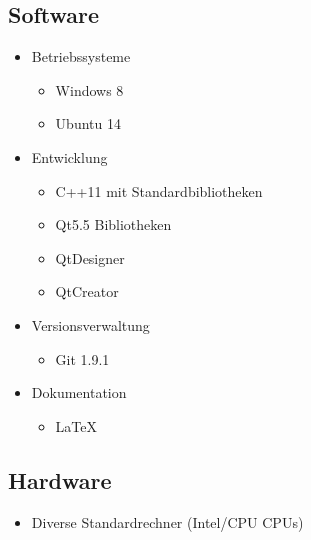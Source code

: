 \subsection{Software}
\begin{itemize}
\item Betriebssysteme
	\begin{itemize}[label={--}]
		\item Windows 8
		\item Ubuntu 14
	\end{itemize}
\item Entwicklung
	\begin{itemize}[label={--}]
		\item C++11 mit Standardbibliotheken
		\item Qt5.5 Bibliotheken
		\item QtDesigner
		\item QtCreator
	\end{itemize}
\item Versionsverwaltung
	\begin{itemize}[label={--}]
		\item Git 1.9.1
	\end{itemize}
\item Dokumentation
	\begin{itemize}[label={--}]
		\item LaTeX
	\end{itemize}
\end{itemize}

\subsection{Hardware}
\begin{itemize}
	\item Diverse Standardrechner (Intel/CPU CPUs)
\end{itemize}
